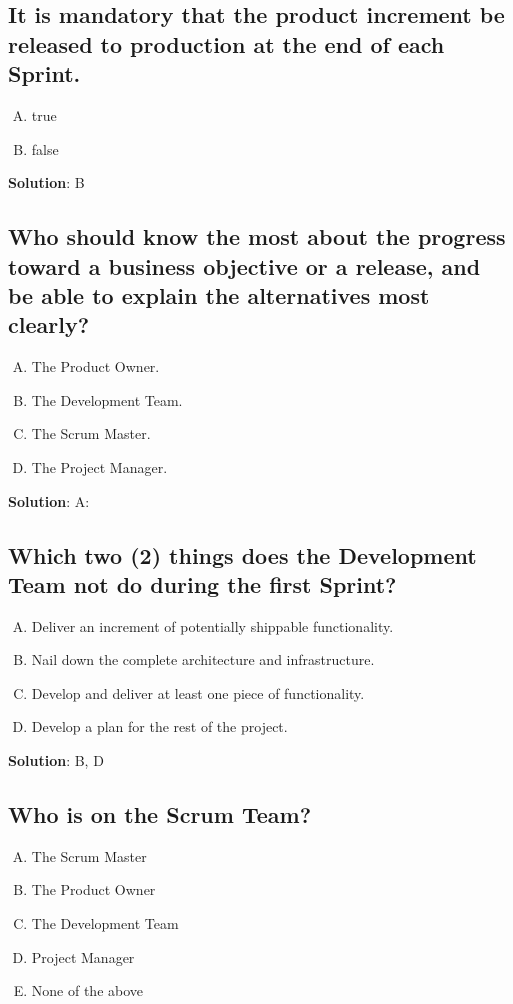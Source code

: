 \subsection{It is mandatory that the product increment be released to production at the end of each Sprint.}
\begin{enumerate}[A)]
  \item true
  \item false
\end{enumerate}


\textbf{Solution}: B


\subsection{Who should know the most about the progress toward a business objective or a
  release, and be able to explain the alternatives most clearly?}
\begin{enumerate}[A)]
  \item The Product Owner.
  \item The Development Team.
  \item The Scrum Master.
  \item The Project Manager.
\end{enumerate}


\textbf{Solution}: A:


\subsection{Which two (2) things does the Development Team not do during the first Sprint?}
\begin{enumerate}[A)]
  \item Deliver an increment of potentially shippable functionality.
  \item Nail down the complete architecture and infrastructure.
  \item Develop and deliver at least one piece of functionality.
  \item Develop a plan for the rest of the project.
\end{enumerate}


\textbf{Solution}: B, D


\subsection{Who is on the Scrum Team?}

\begin{enumerate}[A)]
  \item The Scrum Master
  \item The Product Owner
  \item The Development Team
  \item Project Manager
  \item None of the above
\end{enumerate}


